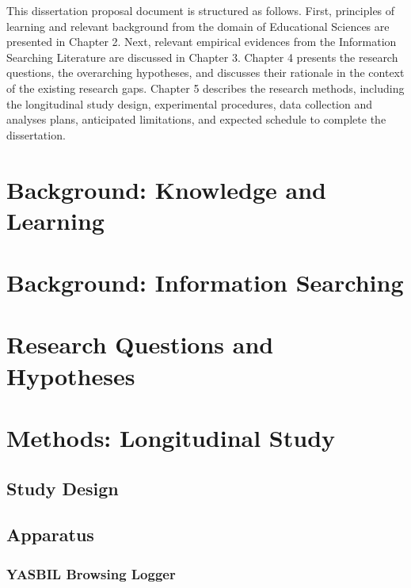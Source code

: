 \documentclass[a4paper, nobind]{templates/ociamthesis}
\begin{document}
This dissertation proposal document is structured as follows. First,
principles of learning and relevant background from the domain of
Educational Sciences are presented in Chapter 2. Next, relevant
empirical evidences from the Information Searching Literature are
discussed in Chapter 3. Chapter 4 presents the research questions, the
overarching hypotheses, and discusses their rationale in the context of
the existing research gaps. Chapter 5 describes the research methods,
including the longitudinal study design, experimental procedures, data
collection and analyses plans, anticipated limitations, and expected
schedule to complete the dissertation.

\hypertarget{ch_bg_learn}{%
\chapter{Background: Knowledge and Learning}\label{ch_bg_learn}}

\hypertarget{ch_bg_search}{%
\chapter{Background: Information Searching}\label{ch_bg_search}}

\hypertarget{research-questions-and-hypotheses}{%
\chapter{Research Questions and Hypotheses}\label{research-questions-and-hypotheses}}

\hypertarget{methods-longitudinal-study}{%
\chapter{Methods: Longitudinal Study}\label{methods-longitudinal-study}}

\hypertarget{sec_method_exp_design}{%
\section{Study Design}\label{sec_method_exp_design}}

\hypertarget{apparatus}{%
\section{Apparatus}\label{apparatus}}

\hypertarget{yasbil-browsing-logger}{%
\subsection{YASBIL Browsing Logger}\label{yasbil-browsing-logger}}
\end{document}
